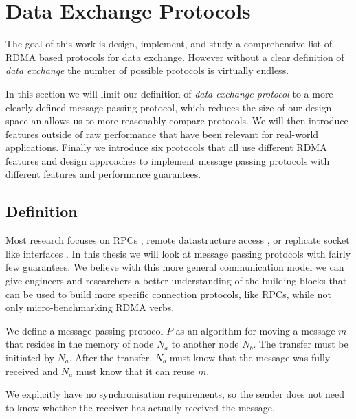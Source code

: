 \section{Data Exchange Protocols}\label{sec:protocols}
The goal of this work is design, implement, and study a comprehensive list of RDMA based protocols for data exchange. 
However without a clear definition of \emph{data exchange} the number of possible protocols is virtually endless.

In this section we will limit our definition of \emph{data exchange protocol} to a more clearly defined message passing
protocol, which reduces the size of our design space an allows us to more reasonably compare protocols. We will then introduce
features outside of raw performance that have been relevant for real-world applications. Finally we introduce six 
protocols that all use different RDMA features and design approaches to implement message passing protocols with different 
features and performance guarantees.

\subsection{Definition}\label{sec:proto-def}

Most research focuses on RPCs \cite{anuj-guide, fasst, herd}, remote datastructure access \cite{pilaf, farm}, or replicate 
socket like interfaces \cite{socksdirect}. In this thesis we will look at message passing protocols with fairly few guarantees.
We believe with this more general communication model we can give engineers and researchers a better understanding of the 
building blocks that can be  used to build more specific connection protocols, like RPCs, while not only 
micro-benchmarking RDMA verbs.



\begin{defn}
We define a message passing protocol $P$ as an algorithm for moving a message $m$ that resides in the memory of
node $N_a$ to another node $N_b$. The transfer must be initiated by $N_a$. After the transfer, $N_b$ must know that the 
message was fully received and $N_a$ must know that it can reuse $m$.
\end{defn}

We explicitly have no synchronisation requirements, so the sender does not need to know whether the receiver has actually 
received the message.

\paragraph{}

